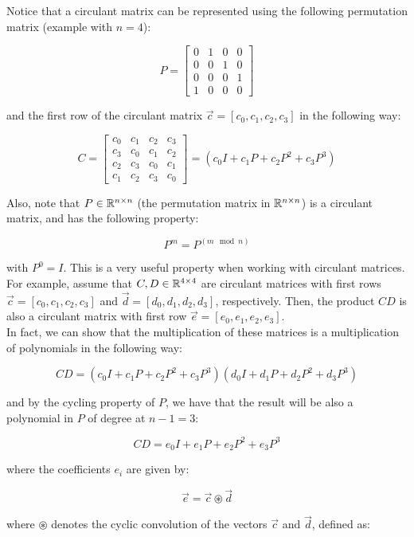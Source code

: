 Notice that a circulant matrix can be represented using the following permutation matrix (example with
$n=4$):

$$P = \begin{bmatrix}
0 & 1 & 0 & 0 \\
0 & 0 & 1 & 0 \\
0 & 0 & 0 & 1 \\
1 & 0 & 0 & 0
\end{bmatrix}$$

and the first row of the circulant matrix $\vec{c} = [c_0, c_1, c_2, c_3]$ in the following way:

$$C = \begin{bmatrix}
c_0 & c_1 & c_2 & c_3 \\
c_3 & c_0 & c_1 & c_2 \\
c_2 & c_3 & c_0 & c_1 \\
c_1 & c_2 & c_3 & c_0
\end{bmatrix} = (c_0 I + c_1 P + c_2 P^2 + c_3 P^3)$$

Also, note that $P \in \mathbb{R}^{n \times n}$ (the permutation matrix in $\mathbb{R}^{n \times n}$) is a circulant matrix, 
and has the following property:

$$P^{m} = P^{(m \mod n)}$$

with $P^0 = I$. This is a very useful property when working with circulant matrices.\\

For example, assume that $C, D \in \mathbb{R}^{4 \times 4}$ are circulant matrices with first rows 
$\vec{c} = [c_0, c_1, c_2, c_3]$ and $\vec{d} = [d_0, d_1, d_2, d_3]$, respectively. Then, the product
$CD$ is also a circulant matrix with first row $\vec{e} = [e_0, e_1, e_2, e_3]$. \\

In fact, we can show that the multiplication of these matrices is a multiplication of polynomials
in the following way:

$$C D = (c_0 I + c_1 P + c_2 P^2 + c_3 P^3)(d_0 I + d_1 P + d_2 P^2 + d_3 P^3)$$

and by the cycling property of $P$, we have that the result will be also a polynomial in $P$ of 
degree at $n-1 = 3$:

$$C D = e_0 I + e_1 P + e_2 P^2 + e_3 P^3$$

where the coefficients $e_i$ are given by:

$$\vec{e} = \vec{c} \circledast \vec{d}$$

where $\circledast$ denotes the cyclic convolution of the vectors $\vec{c}$ and $\vec{d}$, defined as:


